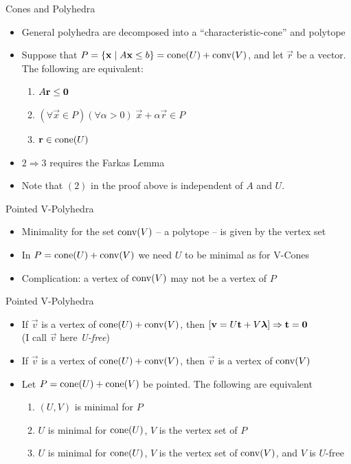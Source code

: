 \documentclass{beamer}
\begin{document}

\begin{frame}{Cones and Polyhedra}
\begin{itemize}
  \item<1-> General polyhedra are decomposed into a ``characteristic-cone'' and polytope
  \item<2-> Suppose that $P = \left\{\mathbf{x}\;|\; A\mathbf{x}\leq b\right\} = \operatorname{cone}(U) + \operatorname{conv}(V)$, and let $\vec{r}$ be a vector.  The following are equivalent:
    \begin{enumerate}
      \item $A\mathbf{r}\leq\mathbf{0}$
      \item $(\forall \vec{x}\in P)(\forall \alpha > 0)\;\vec{x} + \alpha\vec{r} \in P$
      \item $\mathbf{r} \in \operatorname{cone}(U)$
    \end{enumerate}
  \item<3-> $2 \Rightarrow 3$ requires the Farkas Lemma
  \item<4-> Note that $(2)$ in the proof above is independent of $A$ and $U$.
\end{itemize}
\end{frame}

\begin{frame}{Pointed V-Polyhedra}
\begin{itemize}
  \item<1-> Minimality for the set $\operatorname{conv}(V)$ -- a polytope -- is given by the vertex set
  \item<2-> In $P = \operatorname{cone}(U)+\operatorname{conv}(V)$ we need $U$ to be minimal as for V-Cones
  \item<3-> Complication: a vertex of $\operatorname{conv}(V)$ may not be a vertex of $P$
\end{itemize}
\end{frame}

\begin{frame}{Pointed V-Polyhedra}
\begin{itemize}
	\item<1-> If $\vec{v}$ is a vertex of $\operatorname{cone}(U) + \operatorname{conv}(V)$, then $[\mathbf{v} = U\mathbf{t} + V\bm{\lambda}] \Rightarrow \mathbf{t} = \mathbf{0}$  \\
  (I call $\vec{v}$ here \textit{U-free})
  \item<2-> If $\vec{v}$ is a vertex of $\operatorname{cone}(U) + \operatorname{conv}(V)$, then $\vec{v}$ is a vertex of $\operatorname{conv}(V)$
	\item<3-> Let $P = \operatorname{cone}(U)+ \operatorname{cone}(V)$ be pointed.  The following are equivalent
    \begin{enumerate}
      \item $(U,V)$ is minimal for $P$
      \item $U$ is minimal for $\operatorname{cone}(U)$, $V$ is the vertex set of $P$
      \item $U$ is minimal for $\operatorname{cone}(U)$, $V$ is the vertex set of $\operatorname{conv}(V)$, and $V$ is $U$-free
    \end{enumerate}

\end{itemize}
\end{frame}
\end{document}
